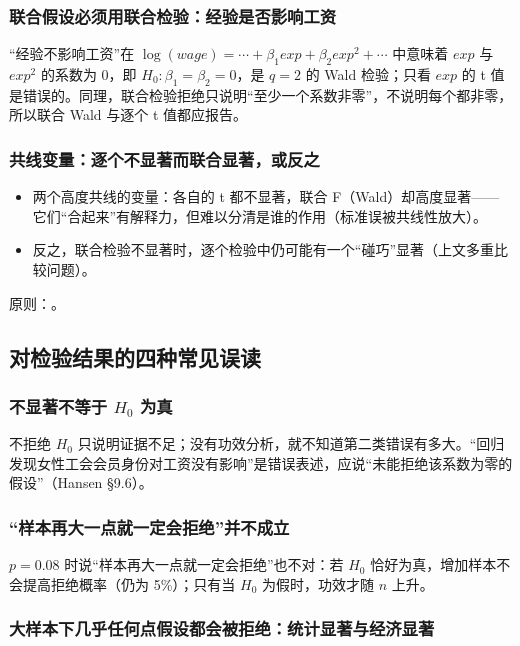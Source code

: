 \subsubsection{联合假设必须用联合检验：经验是否影响工资}

“经验不影响工资”在 $\log(wage)=\cdots+\beta_1 exp+\beta_2 exp^2+\cdots$ 中意味着 $exp$ 与 $exp^2$ 的系数为 0，即 $H_0:\beta_1=\beta_2=0$，是 $q=2$ 的 Wald 检验；只看 $exp$ 的 t 值是错误的。同理，联合检验拒绝只说明“至少一个系数非零”，不说明每个都非零，所以联合 Wald 与逐个 t 值都应报告。

\subsubsection{共线变量：逐个不显著而联合显著，或反之}

\begin{itemize}
  \item 两个高度共线的变量：各自的 t 都不显著，联合 F（Wald）却高度显著——它们“合起来”有解释力，但难以分清是谁的作用（标准误被共线性放大）。
  \item 反之，联合检验不显著时，逐个检验中仍可能有一个“碰巧”显著（上文多重比较问题）。
\end{itemize}
原则：。

\subsection{对检验结果的四种常见误读}

\subsubsection{不显著不等于 \texorpdfstring{$H_0$}{H0} 为真}

不拒绝 $H_0$ 只说明证据不足；没有功效分析，就不知道第二类错误有多大。“回归发现女性工会会员身份对工资没有影响”是错误表述，应说“未能拒绝该系数为零的假设”（Hansen §9.6）。

\subsubsection{“样本再大一点就一定会拒绝”并不成立}

$p=0.08$ 时说“样本再大一点就一定会拒绝”也不对：若 $H_0$ 恰好为真，增加样本不会提高拒绝概率（仍为 5\%）；只有当 $H_0$ 为假时，功效才随 $n$ 上升。

\subsubsection{大样本下几乎任何点假设都会被拒绝：统计显著与经济显著}

